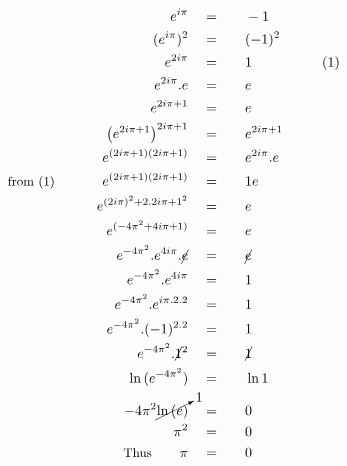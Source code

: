\begin{alignat*}{5}
&\,&e^{i\pi}\quad&=\quad&&-1\\
&\,&(e^{i\pi})^2\quad&=&&(-1)^2\qquad&\,\\
&\,&e^{2i\pi}\quad&=&&1&\small(1)\\
&\,&e^{2i\pi}.e\quad&=&&e\\
&\,&e^{2i\pi+1}\quad&=&&e\\
&\,&\left(e^{2i\pi+1}\right)^{2i\pi+1}\quad&=&&e^{2i\pi+1}\\
&\,&e^{(2i\pi+1)(2i\pi+1)}\quad&=&&e^{2i\pi}.e\\
&\small\text{from (1)}\normalsize\qquad&e^{(2i\pi+1)(2i\pi+1)}\quad&=&&1e\\
&\,&e^{(2i\pi)^2+2.2i\pi+1^2}\quad&=&&e\\
&\,&e^{(-4\pi^2+4i\pi+1)}\quad&=&&e\\
&\,&e^{-4\pi^2}.e^{4i\pi}.\cancel{e}\quad&=&&\cancel{e}\\
&\,&e^{-4\pi^2}.e^{4i\pi}\quad&=&&1\\
&\,&e^{-4\pi^2}.e^{i\pi.2.2}\quad&=&&1\\
&\,&e^{-4\pi^2}.(-1)^{2.2}\quad&=&&1\\
&\,&e^{-4\pi^2}.\cancel{1}^2\quad&=&&\cancel{1}\\
&\,&\ln{(e^{-4\pi^2})}\quad&=&&\ln1\\
&\,&-4\pi^2\cancelto{1}{\ln{(e)}}\quad&=&&0\\
&\,&\pi^2\quad&=&&0\\
&\,&\small\text{Thus}\normalsize\qquad\pi\quad&=&&0
\end{alignat*}
